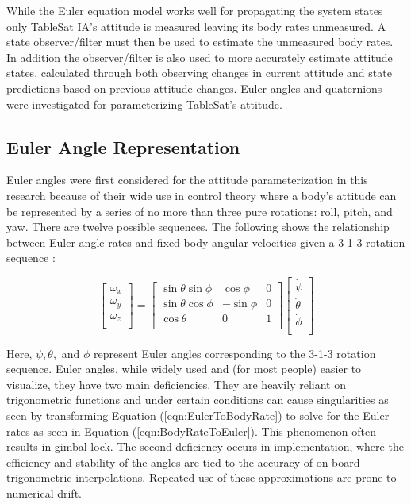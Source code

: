 While the Euler equation model works well for propagating the system states only TableSat IA's attitude is measured leaving its body rates unmeasured.  A state observer/filter must then be used to estimate the unmeasured body rates.  In addition the observer/filter is also used to more accurately estimate attitude states. calculated through both observing changes in current attitude and state predictions based on previous attitude changes.  Euler angles and quaternions were investigated for parameterizing TableSat's attitude.

\subsection{Euler Angle Representation}

Euler angles were first considered for the attitude parameterization in this research because of their wide use in control theory where a body's attitude can be represented by a series of no more than three pure rotations: roll, pitch, and yaw.   There are twelve possible sequences.  The following shows the relationship between Euler angle rates and fixed-body angular velocities given a 3-1-3 rotation sequence \cite{kaplan}:

\begin{equation}
  \begin{bmatrix}
    \omega_x \\
    \omega_y \\
    \omega_z \\
  \end{bmatrix}
  =
  \begin{bmatrix}
    \sin \theta \sin \phi & \cos \phi & 0 \\
    \sin \theta \cos \phi & - \sin \phi & 0 \\
    \cos \theta & 0 & 1 \\
  \end{bmatrix}
  \begin{bmatrix}
    \dot{\psi} \\
    \dot{\theta} \\
    \dot{\phi} \\
  \end{bmatrix}
  \label{eqn:EulerToBodyRate}
\end{equation}

Here, $\psi, \theta,$ and $\phi$ represent Euler angles corresponding to the 3-1-3 rotation sequence.  Euler angles, while widely used and (for most people) easier to visualize, they have two main deficiencies.  They are heavily reliant on trigonometric functions and under certain conditions can cause singularities as seen by transforming Equation (\ref{eqn:EulerToBodyRate}) to solve for the Euler rates as seen in Equation (\ref{eqn:BodyRateToEuler}).  This phenomenon often results in gimbal lock.  The second deficiency occurs in implementation, where the efficiency and stability of the angles are tied to the accuracy of on-board trigonometric interpolations.  Repeated use of these approximations are prone to numerical drift.

